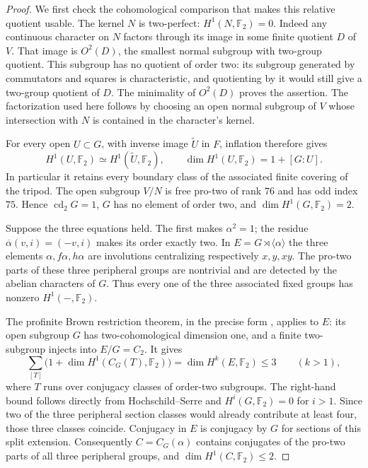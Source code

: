 \begin{proof}
We first check the cohomological comparison that makes this
relative quotient usable. The kernel $N$ is two-perfect:
$H^1(N,\mathbb F_2)=0$. Indeed any continuous character on $N$
factors through its image in some finite quotient $D$ of $V$.
That image is $O^2(D)$, the smallest normal subgroup with
two-group quotient. This subgroup has no quotient of order two:
its subgroup generated by commutators and squares is characteristic,
and quotienting by it would still give a two-group quotient of $D$.
The minimality of $O^2(D)$ proves the assertion. The factorization
used here follows by choosing an open normal subgroup of $V$
whose intersection with $N$ is contained in the character's kernel.

For every open $U\subset G$, with inverse image $\widetilde U$
in $F$, inflation therefore gives
\[
 H^1(U,\mathbb F_2)\simeq H^1(\widetilde U,\mathbb F_2),
 \qquad \dim H^1(U,\mathbb F_2)=1+[G:U].
 \tag{B.16.1}
\]
In particular it retains every boundary class of the associated
finite covering of the tripod. The open subgroup $V/N$ is free
pro-two of rank $76$ and has odd index $75$. Hence
$\operatorname{cd}_2G=1$, $G$ has no element of order two, and
$\dim H^1(G,\mathbb F_2)=2$.

Suppose the three equations held. The first makes $\alpha^2=1$;
the residue $\overline\alpha(v,i)=(-v,i)$ makes its order exactly
two. In $E=G\rtimes\langle\alpha\rangle$ the three elements
$\alpha,f\alpha,h\alpha$ are involutions centralizing respectively
$x,y,xy$. The pro-two parts of these three peripheral groups are
nontrivial and are detected by the abelian characters of $G$.
Thus every one of the three associated fixed groups has nonzero
$H^1(-,\mathbb F_2)$.

The profinite Brown restriction theorem, in the precise form
\cite[Theorem 2 and \S1.1, equations (3)--(6)]{PBC_KZ2007},
applies to $E$: its open subgroup $G$ has two-cohomological
dimension one, and a finite two-subgroup injects into $E/G=C_2$.
It gives
\[
 \sum_{[T]}\bigl(1+\dim H^1(C_G(T),\mathbb F_2)\bigr)
       =\dim H^k(E,\mathbb F_2)\leq3\qquad(k>1),
 \tag{B.16.2}
\]
where $T$ runs over conjugacy classes of order-two subgroups.
The right-hand bound follows directly from Hochschild--Serre
and $H^i(G,\mathbb F_2)=0$ for $i>1$.
Since two of the three peripheral section classes would already
contribute at least four, those three classes coincide. Conjugacy
in $E$ is conjugacy by $G$ for sections of this split extension.
Consequently $C=C_G(\alpha)$ contains conjugates of the pro-two
parts of all three peripheral groups, and
$\dim H^1(C,\mathbb F_2)\leq2$.


\end{proof}
